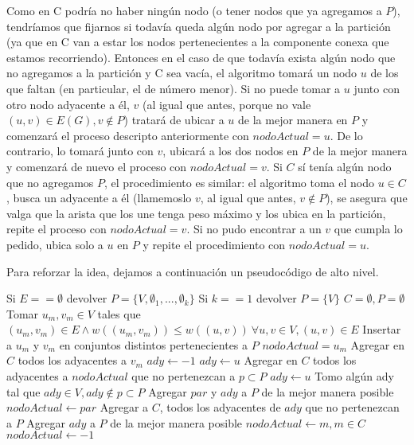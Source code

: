 \documentclass[a4paper]{article}
\begin{document}
\newline Como en C podría no haber ningún nodo (o tener nodos que ya agregamos a $P$), tendríamos que fijarnos si todavía queda algún nodo por agregar a la partición (ya que en C van a estar los nodos pertenecientes a la componente conexa que estamos recorriendo). Entonces en el caso de que todavía exista algún nodo que no agregamos a la partición y C sea vacía, el algoritmo tomará un nodo $u$ de los que faltan (en particular, el de número menor). Si no puede tomar a $u$ junto con otro nodo adyacente a él, $v$ (al igual que antes, porque no vale $(u, v) \in E(G), v \notin P$) tratará de ubicar a $u$ de la mejor manera en $P$ y comenzará el proceso descripto anteriormente con $nodoActual = u$. De lo contrario, lo tomará junto con $v$, ubicará a los dos nodos en $P$ de la mejor manera y comenzará de nuevo el proceso con $nodoActual = v$.
Si $C$ sí tenía algún nodo que no agregamos $P$, el procedimiento es similar: el algoritmo toma el nodo $u \in C$, busca un adyacente a él (llamemoslo $v$, al igual que antes, $v \notin P$), se asegura que valga que la arista que los une tenga peso máximo y los ubica en la partición, repite el proceso con $nodoActual = v$. Si no pudo encontrar a un $v$ que cumpla lo pedido, ubica solo a $u$ en $P$ y repite el procedimiento con $nodoActual = u$.

\vspace{0.8cm}
\noindent Para reforzar la idea, dejamos a continuación un pseudocódigo de alto nivel.
\newline
\begin{algorithmic}[1]
	\State Si $E == \emptyset$ devolver $P = \{V, \emptyset_1, ..., \emptyset_k \}$
	\State Si $k == 1$ devolver $P = \{V\} $
	\newline
	\State $C = \emptyset, P = \emptyset$
	\State Tomar $u_m, v_m \in V$ tales que $(u_m, v_m) \in E \wedge w((u_m, v_m)) \leq w((u, v)) \ \forall u, v \in V, (u, v) \in E$
	\State Insertar a $u_m$ y $v_m$ en conjuntos distintos pertenecientes a $P$
	\State $nodoActual = u_m$
	\State Agregar en $C$ todos los adyacentes a $v_m$
	\newline
		\State $ady \gets -1$
			\State $ady \gets u$
			\State Agregar en $C$ todos los adyacentes a $nodoActual$ que no pertenezcan a $p \subset P$ 
		\Else
				\State $ady \gets u$
			\Else
				\State Tomo algún ady tal que $ady \in V, ady \notin p \subset P$
			\EndIf
		\EndIf
		\newline
				\State Agregar $par$ y $ady$ a $P$ de la mejor manera posible
				\State $nodoActual \gets par$
				\State Agregar a $C$, todos los adyacentes de $ady$ que no pertenezcan a $P$
			\Else
				\State Agregar $ady$ a $P$ de la mejor manera posible
					\State $nodoActual \gets m, m \in C$
				\Else
					\State $nodoActual \gets -1$
				\EndIf
			\EndIf
	\EndWhile
\EndProcedure
\end{algorithmic}
\vspace{0.4cm}
\end{document}
